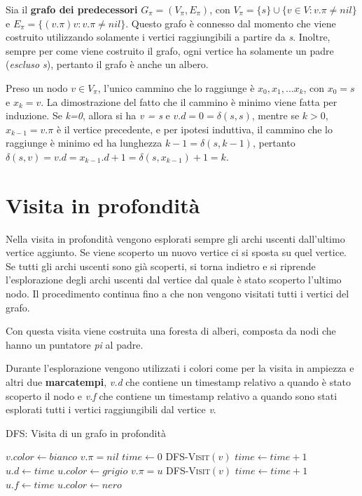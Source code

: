 Sia il \textbf{grafo dei predecessori} $G_{\pi} = (V_{\pi}, E_{\pi})$, con
$V_{\pi} = \{s\} \cup \{v \in V : v.\pi \neq nil\}$ e $E_{\pi} = \{(v.\pi)v :
v.\pi \neq nil\}$. Questo grafo è connesso dal momento che viene costruito
utilizzando solamente i vertici raggiungibili a partire da \emph{s}.
Inoltre, sempre per come viene costruito il grafo, ogni vertice ha
solamente un padre (\emph{escluso s}), pertanto il grafo è anche un
albero.

Preso un nodo $v \in V_{\pi}$, l'unico cammino che lo raggiunge è
$x_0, x_1, \ldots x_k$, con $x_0 = s$ e $x_k = v$. La
dimostrazione del fatto che il cammino è minimo viene fatta per
induzione. Se \emph{k=0}, allora si ha \emph{v = s} e $v.d = 0 =
\delta(s,s)$, mentre se $k >0$, $x_{k-1} = v.\pi$ è il
vertice precedente, e per ipotesi induttiva, il cammino che lo raggiunge
è minimo ed ha lunghezza $k-1 = \delta(s,k-1)$, pertanto
$\delta(s,v) = v.d = x_{k-1}.d+1 = \delta(s,x_{k-1})+1 = k$.

\section{Visita in profondità}\label{visita-in-profondituxe0}

Nella visita in profondità vengono esplorati sempre gli archi uscenti
dall'ultimo vertice aggiunto. Se viene scoperto un nuovo vertice ci si
sposta su quel vertice. Se tutti gli archi uscenti sono già scoperti,
si torna indietro e si riprende l'esplorazione degli archi uscenti dal
vertice dal quale è stato scoperto l'ultimo nodo. Il procedimento
continua fino a che non vengono visitati tutti i vertici del grafo.

Con questa visita viene costruita una foresta di alberi, composta da
nodi che hanno un puntatore \emph{pi} al padre.

Durante l'esplorazione vengono utilizzati i colori come per la visita in
ampiezza e altri due \textbf{marcatempi}, \emph{v.d} che contiene un
timestamp relativo a quando è stato scoperto il nodo e \emph{v.f} che
contiene un timestamp relativo a quando sono stati esplorati tutti i
vertici raggiungibili dal vertice \emph{v}.

\begin{breakablealgorithm}
	\caption{DFS: Visita di un grafo in profondità}
	\begin{algorithmic}[1]
				\State $v.color \gets bianco$
				\State $ v.\pi = nil $
			\EndFor
			\State $ time \gets 0 $
					\State \textsc{DFS-Visit}$ (v) $
				\EndIf
			\EndFor
		\EndFunction
		\Statex
			\State $ time \gets time + 1 $
			\State $ u.d \gets time $
			\State $ u.color \gets grigio $
					\State $ v.\pi = u $
					\State \textsc{DFS-Visit}$ (v) $  
				\EndIf
			\EndFor
			\State $ time \gets time + 1 $
		    \State $ u.f \gets time $
		    \State $ u.color \gets nero $
		\EndFunction
	\end{algorithmic}
\end{breakablealgorithm}

